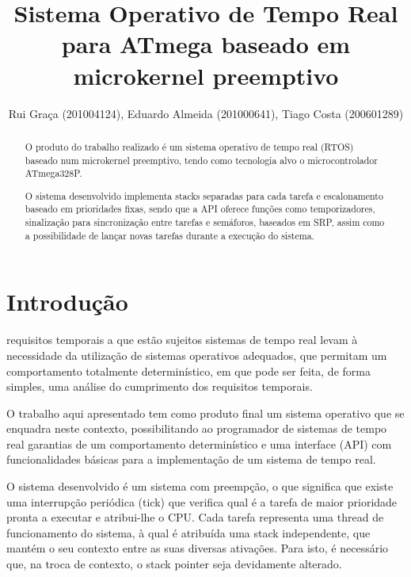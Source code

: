 \documentclass[journal]{IEEEtran}
\begin{document}
\title{Sistema Operativo de Tempo Real para ATmega baseado em microkernel preemptivo}
\author{Rui Graça (201004124), Eduardo Almeida (201000641), Tiago Costa (200601289)}

%
{}


\maketitle


\begin{abstract}
	O produto do trabalho realizado é um sistema operativo de tempo real (RTOS) baseado num microkernel preemptivo, tendo como tecnologia alvo o microcontrolador
	ATmega328P.

	O sistema desenvolvido implementa stacks separadas para cada tarefa e escalonamento baseado em prioridades fixas, sendo que a API oferece funções como temporizadores,
	sinalização para sincronização entre tarefas e semáforos, baseados em SRP, assim como a possibilidade de lançar novas tarefas durante a execução do sistema.
\end{abstract}

\section{Introdução}
 requisitos temporais a que estão sujeitos sistemas de tempo real levam à necessidade da utilização de sistemas operativos adequados, que permitam um
comportamento totalmente determinístico, em que pode ser feita, de forma simples, uma análise do cumprimento dos requisitos temporais.

O trabalho aqui apresentado tem como produto final um sistema operativo que se enquadra neste contexto, possibilitando ao programador de sistemas de tempo real garantias
de um comportamento determinístico e uma interface (API) com funcionalidades básicas para a implementação de um sistema de tempo real.

O sistema desenvolvido é um sistema com preempção, o que significa que existe uma interrupção periódica (tick) que verifica qual é a tarefa de maior prioridade pronta a
executar e atribui-lhe o CPU.
Cada tarefa representa uma thread de funcionamento do sistema, à qual é atribuída uma stack independente, que mantém o seu contexto entre as suas diversas ativações.
Para isto, é necessário que, na troca de contexto, o stack pointer seja devidamente alterado.
\end{document}
